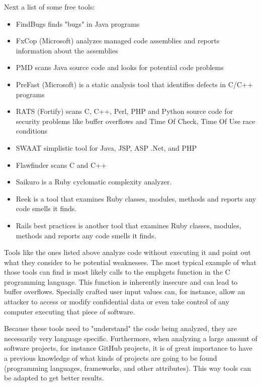Next a list of some free tools:
\begin{itemize}
\item\textsf{FindBugs} finds "bugs" in Java programs
\item\textsf{FxCop (Microsoft)} analyzes managed code assemblies and reports information about the assemblies
\item\textsf{PMD} scans Java source code and looks for potential code problems
\item\textsf{PreFast} (Microsoft) is a static analysis tool that identifies defects in C/C++ programs
\item\textsf{RATS} (Fortify) scans C, C++, Perl, PHP and Python source code for security problems like buffer overflows and Time Of Check, Time Of Use race conditions
\item\textsf{SWAAT} simplistic tool for Java, JSP, ASP .Net, and PHP
\item\textsf{Flawfinder} scans C and C++
\item\textsf{Saikuro} is a Ruby cyclomatic complexity analyzer.
\item\textsf{Reek} is a tool that examines Ruby classes, modules, methods and reports any code smells it finds.
\item\textsf{Rails best practices} is another tool that examines Ruby classes, modules, methods and reports any code smells it finds.




\end{itemize}

Tools like the ones listed above analyze code without executing it and point out what they consider to be potential weaknesses.
The most typical example of what those tools can find is most likely calls to the emph{gets} function in
the C programming language. This function is inherently insecure and can lead to buffer
overflows. Specially crafted user input values can, for instance, allow an attacker to access
or modify confidential data or even take control of any computer executing that piece of
software.

Because these tools need to "understand" the code being analyzed, they are necessarily very language specific.
Furthermore, when analyzing a large amount of software projects, for instance GitHub projects,
it is of great importance to have a previous knowledge of what kinds of projects  are going to be found (programming languages, frameworks, and other attributes).
This way tools can be adapted to get better results. 

